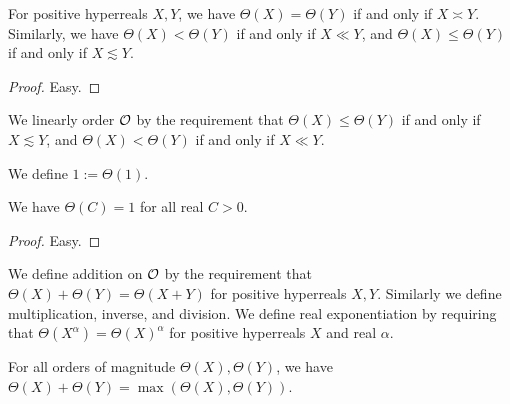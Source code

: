 \begin{lemma}\label{theta-kernel}\leanok For positive hyperreals $X,Y$, we have $\Theta(X) = \Theta(Y)$ if and only if $X \asymp Y$.  Similarly, we have $\Theta(X) < \Theta(Y)$ if and only if $X \ll Y$, and $\Theta(X) \leq \Theta(Y)$ if and only if $X \lesssim Y$.
\end{lemma}

\begin{proof}\leanok Easy.
\end{proof}

\begin{definition}\label{ord-mag-def}\leanok  We linearly order ${\mathcal O}$ by the requirement that $\Theta(X) \leq \Theta(Y)$ if and only if $X \lesssim Y$, and  $\Theta(X) < \Theta(Y)$ if and only if $X \ll Y$.
\end{definition}

\begin{definition}[One]\label{one-def}\label{OrderOfMagnitude.one}\leanok We define $1 := \Theta(1)$.
\end{definition}

\begin{lemma}\label{const-triv}\leanok We have $\Theta(C) = 1$ for all real $C>0$.
\end{lemma}

\begin{proof}\leanok Easy.
\end{proof}

\begin{definition}\label{mag-arith}  We define addition on ${\mathcal O}$ by the requirement that $\Theta(X) + \Theta(Y) = \Theta(X+Y)$ for positive hyperreals $X,Y$.  Similarly we define multiplication, inverse, and division.  We define real exponentiation by requiring that $\Theta(X^\alpha) = \Theta(X)^\alpha$ for positive hyperreals $X$ and real $\alpha$.
\end{definition}

\begin{lemma}\label{tropical-add} For all orders of magnitude $\Theta(X), \Theta(Y)$, we have $\Theta(X) + \Theta(Y) = \max(\Theta(X), \Theta(Y))$.
\end{lemma}

